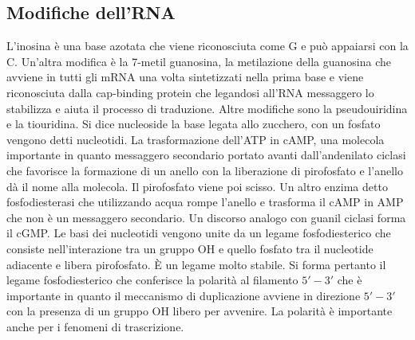 \subsection{Modifiche dell'RNA}
L'inosina \`e una base azotata che viene riconosciuta come G e pu\`o appaiarsi con la C. Un'altra modifica \`e la 7-metil guanosina, la metilazione della guanosina che avviene in tutti 
gli mRNA una volta sintetizzati nella prima base e viene riconosciuta dalla cap-binding protein che legandosi all'RNA messaggero lo stabilizza e aiuta il processo di traduzione. Altre 
modifiche sono la pseudouiridina e la tiouridina. Si dice nucleoside la base legata allo zucchero, con un fosfato vengono detti nucleotidi. La trasformazione dell'ATP in cAMP, una 
molecola importante in quanto messaggero secondario portato avanti dall'andenilato ciclasi che favorisce la formazione di un anello con la liberazione di pirofosfato e l'anello d\`a il 
nome alla molecola. Il pirofosfato viene poi scisso. Un altro enzima detto fosfodiesterasi che utilizzando acqua rompe l'anello e trasforma il cAMP in AMP che non \`e un messaggero 
secondario. Un discorso analogo con guanil ciclasi forma il cGMP. Le basi dei nucleotidi vengono unite da un legame fosfodiesterico che consiste nell'interazione tra un gruppo OH e quello
fosfato tra il nucleotide adiacente e libera pirofosfato. \`E un legame molto stabile. Si forma pertanto il legame fosfodiesterico che conferisce la polarit\`a al filamento $5'-3'$ che 
\`e importante in quanto il meccanismo di duplicazione avviene in direzione $5'-3'$ con la presenza di un gruppo OH libero per avvenire. La polarit\`a \`e importante anche per i fenomeni
di trascrizione.
